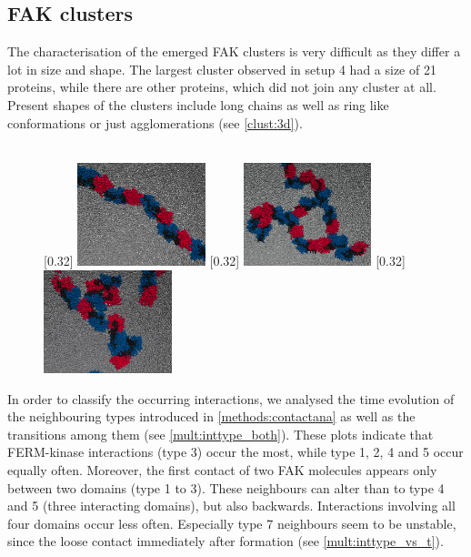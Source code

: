 \subsection{FAK clusters}
\label{mult:oligs}
The characterisation of the emerged FAK clusters is very difficult as they differ a lot in size and shape. The largest cluster observed in setup 4 had a size of 21 proteins, while there are other proteins, which did not join any cluster at all. Present shapes of the clusters include long chains as well as ring like conformations or just agglomerations (see \autoref{clust:3d}).\\
\\
%
%
%
\begin{figure}
	\subcaptionbox{\label{clust:3d_chain}}[0.32\textwidth]{
		\includegraphics[height=3cm]{figures/results/fak_chainlike}
	}\hfill%
	\subcaptionbox{\label{clust:3d_ring}}[0.32\textwidth]{
		\includegraphics[height=3cm]{figures/results/fak_circle}
	}\hfill%
	\subcaptionbox{\label{clust:3d_aggl}}[0.32\textwidth]{
		\includegraphics[height=3cm]{figures/results/fak_agglo}
	}
	\label{clust:3d}
\end{figure}
%
%
%
In order to classify the occurring interactions, we analysed the time evolution of the neighbouring types introduced in \autoref{methods:contactana} as well as the transitions among them (see \autoref{mult:inttype_both}). These plots indicate that FERM-kinase interactions (type 3) occur the most, while type 1, 2, 4 and 5 occur equally often. Moreover, the first contact of two FAK molecules appears only between two domains (type 1 to 3). These neighbours can alter than to type 4 and 5 (three interacting domains), but also backwards. Interactions involving all four domains occur less often. Especially type 7 neighbours seem to be unstable, since the loose contact immediately after formation (see \autoref{mult:inttype_vs_t}).\\
